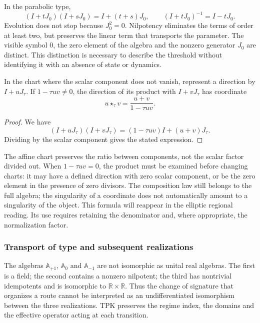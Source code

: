 In the parabolic type,
\[
 (I+tJ_0)(I+sJ_0)=I+(t+s)J_0,\qquad
 (I+tJ_0)^{-1}=I-tJ_0.
\]
Evolution does not stop because \(J_0^2=0\). Nilpotency eliminates the
terms of order at least two, but preserves the linear term that
transports the parameter. The visible symbol \(0\), the
zero element of the algebra and the nonzero generator \(J_0\) are distinct. This distinction
is necessary to describe the threshold without identifying it with an absence of
state or dynamics.

\begin{proposition}
\label{x_reciprocidad:trit-ampl-prop-pendientes}
In the chart where the scalar component does not vanish, represent a
direction by \(I+uJ_\tau\). If \(1-\tau uv\ne0\), the direction of its
product with \(I+vJ_\tau\) has coordinate
\[
 u\star_\tau v=\frac{u+v}{1-\tau uv}.
\]
\end{proposition}
\begin{proof}
We have
\[
 (I+uJ_\tau)(I+vJ_\tau)
   =(1-\tau uv)I+(u+v)J_\tau.
\]
Dividing by the scalar component gives the stated expression.
\end{proof}

The affine chart preserves the ratio between components, not the scalar factor
divided out. When \(1-\tau uv=0\), the product must be examined before
changing charts: it may have a defined direction with zero scalar
component, or be the zero element in the presence of zero divisors. The composition
law still belongs to the full algebra; the singularity of
a coordinate does not automatically amount to a singularity of the object.
This formula will reappear in the elliptic regional reading. Its use requires
retaining the denominator and, where appropriate, the normalization factor.

\subsubsection{Transport of type and subsequent realizations}
\label{x_reciprocidad:trit-ampl-puentes}

The algebras \(\mathbb A_{+1}\), \(\mathbb A_0\) and
\(\mathbb A_{-1}\) are not isomorphic as unital real algebras.
The first is a field; the second contains a nonzero nilpotent; the
third has nontrivial idempotents and is isomorphic to
\(\mathbb R\times\mathbb R\). Thus the change of signature that organizes a
route cannot be interpreted as an undifferentiated isomorphism between the
three realizations. TPK preserves the regime index, the domains and the
effective operator acting at each transition.


